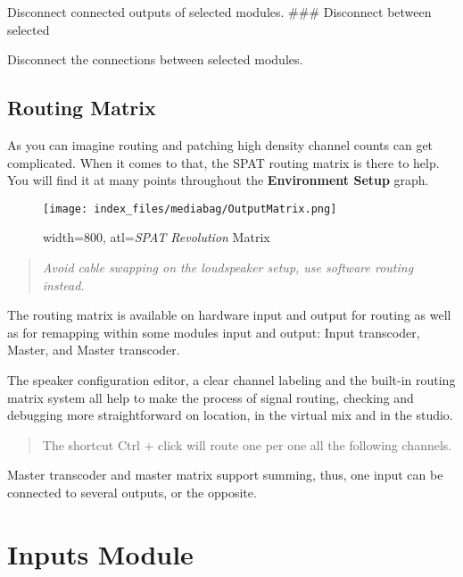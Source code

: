 \documentclass[
  letterpaper,
  DIV=11,
  numbers=noendperiod]{scrreport}
\begin{document}
Disconnect connected outputs of selected modules. \#\#\# Disconnect
between selected

Disconnect the connections between selected modules.

\hypertarget{routing-matrix}{%
\section{Routing Matrix}\label{routing-matrix}}

As you can imagine routing and patching high density channel counts can
get complicated. When it comes to that, the SPAT routing matrix is there
to help. You will find it at many points throughout the
\textbf{Environment Setup} graph.

\begin{figure}

{\centering \texttt{[image: index\_files/mediabag/OutputMatrix.png]}

}

\caption{width=800, atl=\emph{SPAT Revolution} Matrix}

\end{figure}

\begin{quote}
\emph{Avoid cable swapping on the loudspeaker setup, use software
routing instead.}
\end{quote}

The routing matrix is available on hardware input and output for routing
as well as for remapping within some modules input and output: Input
transcoder, Master, and Master transcoder.

The speaker configuration editor, a clear channel labeling and the
built-in routing matrix system all help to make the process of signal
routing, checking and debugging more straightforward on location, in the
virtual mix and in the studio.

\begin{quote}
The shortcut Ctrl + click will route one per one all the following
channels.
\end{quote}

Master transcoder and master matrix support summing, thus, one input can
be connected to several outputs, or the opposite.

\hypertarget{inputs-module}{%
\chapter{Inputs Module}\label{inputs-module}}
\end{document}
